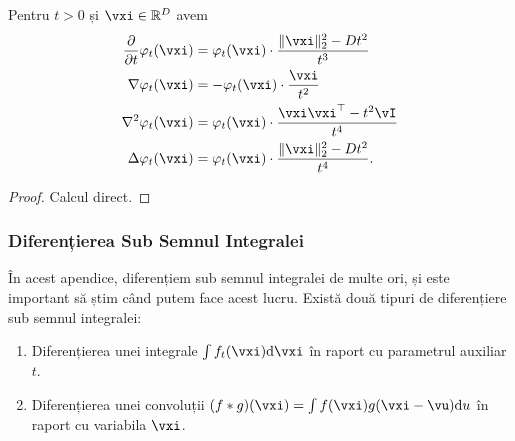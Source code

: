 \documentclass[../../book-main_ro.tex]{subfiles}
\begin{document}
\begin{proposition}\label{prop:normal_derivatives}
    Pentru \(t > 0\) și \(\vxi \in \R^{D}\) avem
    \begin{align}
        \pdv*{\phi_{t}}{t}(\vxi)
        &= \phi_{t}(\vxi) \cdot \frac{\norm{\vxi}_{2}^{2} - Dt^{2}}{t^{3}} \\
        \nabla \phi_{t}(\vxi)
        &= -\phi_{t}(\vxi)\cdot\frac{\vxi}{t^{2}} \\ 
        \nabla^{2} \phi_{t}(\vxi)
        &= \phi_{t}(\vxi)\cdot\frac{\vxi\vxi^{\top} - t^{2}\vI}{t^{4}} \\
        \Delta \phi_{t}(\vxi)
        &= \phi_{t}(\vxi) \cdot \frac{\norm{\vxi}_{2}^{2} - Dt^{2}}{t^{4}}.
    \end{align}
\end{proposition}
\begin{proof}
    Calcul direct.
\end{proof}



\subsubsection{Diferențierea Sub Semnul Integralei}

În acest apendice, diferențiem sub semnul integralei de multe ori, și este important să știm când putem face acest lucru. Există două tipuri de diferențiere sub semnul integralei:
\begin{enumerate}
    \item Diferențierea unei integrale \(\int f_{t}(\vxi)\odif{\vxi}\) în raport cu parametrul auxiliar \(t\).
    \item Diferențierea unei convoluții \((f * g)(\vxi) = \int f(\vxi)g(\vxi - \vu)\odif{u}\) în raport cu variabila \(\vxi\).
\end{enumerate}
\end{document}
